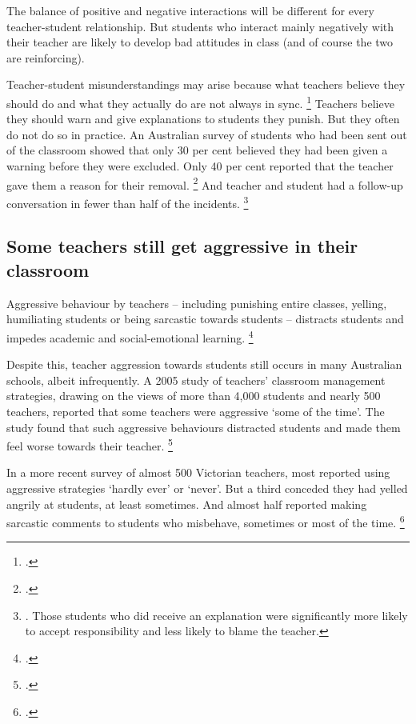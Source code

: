 \documentclass{grattan}
\begin{document}
The balance of positive and negative interactions will be different for every teacher-student relationship. But students who interact mainly negatively with their teacher are likely to develop bad attitudes in class (and of course the two are reinforcing).

Teacher-student misunderstandings may arise because what teachers believe they should do and what they actually do are not always in sync.%
    \footcite{Fang1996ReviewResearchTeacher}
Teachers believe they should warn and give explanations to students they punish. But they often do not do so in practice. An Australian survey of students who had been sent out of the classroom showed that only 30 per cent believed they had been given a warning before they were excluded. Only 40 per cent reported that the teacher gave them a reason for their removal.%
    \footcite{Lewis2012ExcludingStudentsClassroom}
And teacher and student had a follow-up conversation in fewer than half of the incidents.%
    \footnote{\textcite{Lewis2012ExcludingStudentsClassroom}. Those students who did receive an explanation were significantly more likely to accept responsibility and less likely to blame the teacher.}

\subsection{Some teachers still get aggressive in their classroom}\label{subsec:some-teachers-get-aggressive}
Aggressive behaviour by teachers -- including punishing entire classes, yelling, humiliating students or being sarcastic towards students -- distracts students and impedes academic and social-emotional learning.%
    \footcites{Lewis2008StudentsReactionClassroom}{Lewis2001ClassroomDisciplineStudent}{RileyBrew2010WhyDidYouDoThat}

Despite this, teacher aggression towards students still occurs in many Australian schools, albeit infrequently. A 2005 study of teachers' classroom management strategies, drawing on the views of more than 4,000 students and nearly 500 teachers, reported that some teachers were aggressive `some of the time'. The study found that such aggressive behaviours distracted students and made them feel worse towards their teacher.%
    \footcite{Lewis2008StudentsReactionClassroom}

In a more recent survey of almost 500 Victorian teachers, most reported using aggressive strategies `hardly ever' or `never'. But a third conceded they had yelled angrily at students, at least sometimes. And almost half reported making sarcastic comments to students who misbehave, sometimes or most of the time.%
    \footcite{Romi2011ImpactTeachersAggressive}
\end{document}

